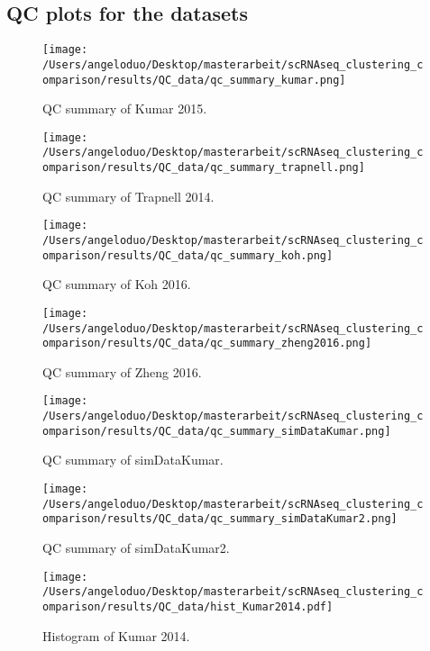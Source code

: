 \documentclass[12pt, a4paper]{article}\usepackage[]{graphicx}\usepackage[]{color}
\begin{document}
\newpage


\subsection{QC plots for the datasets}

\begin{figure}[!h]
\centering
\texttt{[image: /Users/angeloduo/Desktop/masterarbeit/scRNAseq\_clustering\_comparison/results/QC\_data/qc\_summary\_kumar.png]}
\caption{QC summary of Kumar 2015. }
\label{fig:qckumar}
\end{figure}

\begin{figure}[!h]
\centering
\texttt{[image: /Users/angeloduo/Desktop/masterarbeit/scRNAseq\_clustering\_comparison/results/QC\_data/qc\_summary\_trapnell.png]}
\caption{QC summary of Trapnell 2014. }
\label{fig:qctrapnell}
\end{figure}

\begin{figure}[!h]
\centering
\texttt{[image: /Users/angeloduo/Desktop/masterarbeit/scRNAseq\_clustering\_comparison/results/QC\_data/qc\_summary\_koh.png]}
\caption{QC summary of Koh 2016. }
\label{fig:qckoh}
\end{figure}

\begin{figure}[!h]
\centering
\texttt{[image: /Users/angeloduo/Desktop/masterarbeit/scRNAseq\_clustering\_comparison/results/QC\_data/qc\_summary\_zheng2016.png]}
\caption{QC summary of Zheng 2016. }
\label{fig:qczheng}
\end{figure}

\begin{figure}[!h]
\centering
\texttt{[image: /Users/angeloduo/Desktop/masterarbeit/scRNAseq\_clustering\_comparison/results/QC\_data/qc\_summary\_simDataKumar.png]}
\caption{QC summary of simDataKumar. }
\label{fig:simDataKumar}
\end{figure}


\begin{figure}[!h]
\centering
\texttt{[image: /Users/angeloduo/Desktop/masterarbeit/scRNAseq\_clustering\_comparison/results/QC\_data/qc\_summary\_simDataKumar2.png]}
\caption{QC summary of simDataKumar2. }
\label{fig:simDataKumar}
\end{figure}



\clearpage


\begin{figure}[!h]
\centering

\texttt{[image: /Users/angeloduo/Desktop/masterarbeit/scRNAseq\_clustering\_comparison/results/QC\_data/hist\_Kumar2014.pdf]}
\caption{Histogram of Kumar 2014.}
\label{fig:histkumar}
\end{figure}
\end{document}

